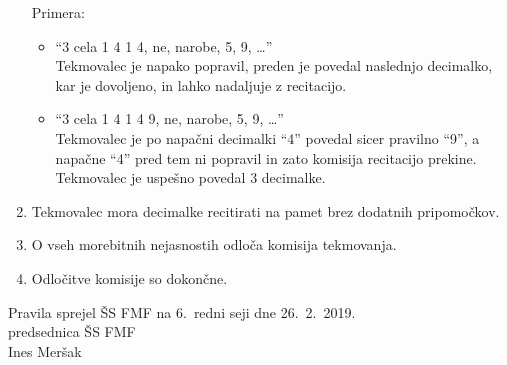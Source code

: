 \documentclass[a4paper,oneside,12pt]{article}
\theoremstyle{definition}
\begin{document}
\begin{enumerate}
    Primera: \\[-20pt]
    \begin{itemize}
      \item ``3 cela 1 4 1 4, ne, narobe, 5, 9, \ldots'' \\
        Tekmovalec je napako popravil, preden je povedal naslednjo decimalko, kar
        je dovoljeno, in lahko nadaljuje z recitacijo.
      \item ``3 cela 1 4 1 4 9, ne, narobe, 5, 9, \ldots'' \\
        Tekmovalec je po napačni decimalki ``4'' povedal sicer pravilno ``9'', a napačne ``4'' pred
        tem ni popravil in zato komisija recitacijo prekine. Tekmovalec je uspešno povedal 3 decimalke.
    \end{itemize}
  \item Tekmovalec mora decimalke recitirati na pamet brez dodatnih pripomočkov.
  \item O vseh morebitnih nejasnostih odloča komisija tekmovanja.
  \item Odločitve komisije so dokončne.
\end{enumerate}

\vspace{3ex}

Pravila sprejel ŠS FMF na 6.~redni seji dne 26.~2.~2019. \\

\hspace*{\fill} predsednica ŠS FMF \\
\hspace*{\fill} Ines Meršak
\end{document}
